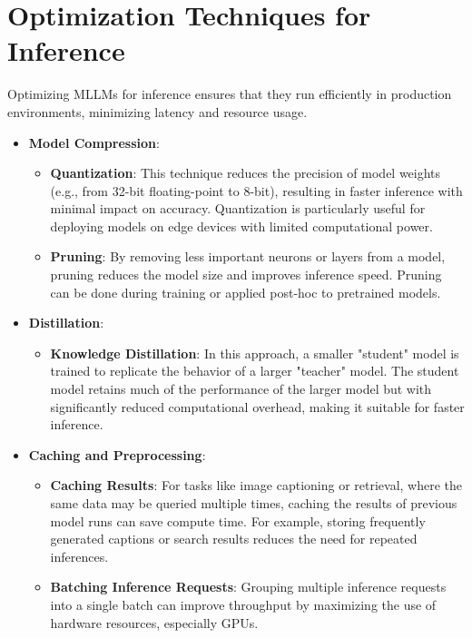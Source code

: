 \section{Optimization Techniques for Inference}

Optimizing MLLMs for inference ensures that they run efficiently in production environments, minimizing latency and resource usage.

\begin{itemize}
    \item \textbf{Model Compression}:
    \begin{itemize}
        \item \textbf{Quantization}: This technique reduces the precision of model weights (e.g., from 32-bit floating-point to 8-bit), resulting in faster inference with minimal impact on accuracy. Quantization is particularly useful for deploying models on edge devices with limited computational power.
        \item \textbf{Pruning}: By removing less important neurons or layers from a model, pruning reduces the model size and improves inference speed. Pruning can be done during training or applied post-hoc to pretrained models.
    \end{itemize}
    \item \textbf{Distillation}:
    \begin{itemize}
        \item \textbf{Knowledge Distillation}: In this approach, a smaller "student" model is trained to replicate the behavior of a larger "teacher" model. The student model retains much of the performance of the larger model but with significantly reduced computational overhead, making it suitable for faster inference.
    \end{itemize}
    \item \textbf{Caching and Preprocessing}:
    \begin{itemize}
        \item \textbf{Caching Results}: For tasks like image captioning or retrieval, where the same data may be queried multiple times, caching the results of previous model runs can save compute time. For example, storing frequently generated captions or search results reduces the need for repeated inferences.
        \item \textbf{Batching Inference Requests}: Grouping multiple inference requests into a single batch can improve throughput by maximizing the use of hardware resources, especially GPUs.
    \end{itemize}

\end{itemize}
